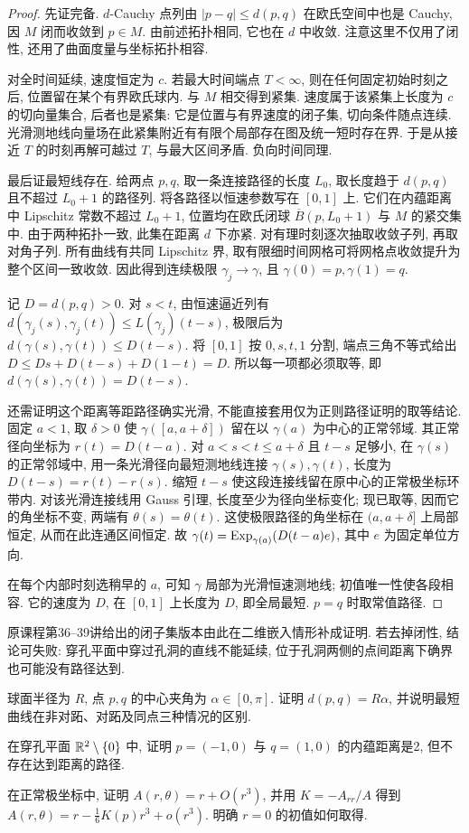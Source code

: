 \begin{proof}
先证完备. $d$-Cauchy 点列由 $|p-q|\le d(p,q)$ 在欧氏空间中也是 Cauchy, 因 $M$ 闭而收敛到 $p\in M$. 由前述拓扑相同, 它也在 $d$ 中收敛. 注意这里不仅用了闭性, 还用了曲面度量与坐标拓扑相容.

对全时间延续, 速度恒定为 $c$. 若最大时间端点 $T<\infty$, 则在任何固定初始时刻之后, 位置留在某个有界欧氏球内. 与 $M$ 相交得到紧集. 速度属于该紧集上长度为 $c$ 的切向量集合, 后者也是紧集: 它是位置与有界速度的闭子集, 切向条件随点连续. 光滑测地线向量场在此紧集附近有有限个局部存在图及统一短时存在界. 于是从接近 $T$ 的时刻再解可越过 $T$, 与最大区间矛盾. 负向时间同理.

最后证最短线存在. 给两点 $p,q$, 取一条连接路径的长度 $L_0$, 取长度趋于 $d(p,q)$ 且不超过 $L_0+1$ 的路径列. 将各路径以恒速参数写在 $[0,1]$ 上. 它们在内蕴距离中 Lipschitz 常数不超过 $L_0+1$, 位置均在欧氏闭球 $\overline B(p,L_0+1)$ 与 $M$ 的紧交集中. 由于两种拓扑一致, 此集在距离 $d$ 下亦紧. 对有理时刻逐次抽取收敛子列, 再取对角子列. 所有曲线有共同 Lipschitz 界, 取有限细时间网格可将网格点收敛提升为整个区间一致收敛. 因此得到连续极限 $\gamma_j\to\gamma$, 且 $\gamma(0)=p,\gamma(1)=q$.

记 $D=d(p,q)>0$. 对 $s<t$, 由恒速逼近列有 $d(\gamma_j(s),\gamma_j(t))\le L(\gamma_j)(t-s)$, 极限后为 $d(\gamma(s),\gamma(t))\le D(t-s)$. 将 $[0,1]$ 按 $0,s,t,1$ 分割, 端点三角不等式给出 $D\le Ds+D(t-s)+D(1-t)=D$. 所以每一项都必须取等, 即 $d(\gamma(s),\gamma(t))=D(t-s)$.

还需证明这个距离等距路径确实光滑, 不能直接套用仅为正则路径证明的取等结论. 固定 $a<1$, 取 $\delta>0$ 使 $\gamma([a,a+\delta])$ 留在以 $\gamma(a)$ 为中心的正常邻域. 其正常径向坐标为 $r(t)=D(t-a)$. 对 $a<s<t\le a+\delta$ 且 $t-s$ 足够小, 在 $\gamma(s)$ 的正常邻域中, 用一条光滑径向最短测地线连接 $\gamma(s),\gamma(t)$, 长度为 $D(t-s)=r(t)-r(s)$. 缩短 $t-s$ 使这段连接线留在原中心的正常极坐标环带内. 对该光滑连接线用 Gauss 引理, 长度至少为径向坐标变化; 现已取等, 因而它的角坐标不变, 两端有 $\theta(s)=\theta(t)$. 这使极限路径的角坐标在 $(a,a+\delta]$ 上局部恒定, 从而在此连通区间恒定. 故 $\gamma(t)=\operatorname{Exp}_{\gamma(a)}(D(t-a)e)$, 其中 $e$ 为固定单位方向.

在每个内部时刻选稍早的 $a$, 可知 $\gamma$ 局部为光滑恒速测地线; 初值唯一性使各段相容. 它的速度为 $D$, 在 $[0,1]$ 上长度为 $D$, 即全局最短. $p=q$ 时取常值路径.
\end{proof}
原课程第36--39讲给出的闭子集版本由此在二维嵌入情形补成证明. 若去掉闭性, 结论可失败: 穿孔平面中穿过孔洞的直线不能延续, 位于孔洞两侧的点间距离下确界也可能没有路径达到.
\begin{exercise}\label{ex:9a}
球面半径为 $R$, 点 $p,q$ 的中心夹角为 $\alpha\in[0,\pi]$. 证明 $d(p,q)=R\alpha$, 并说明最短曲线在非对跖、对跖及同点三种情况的区别.
\end{exercise}
\begin{exercise}\label{ex:9b}
在穿孔平面 $\mathbb R^2\setminus\{0\}$ 中, 证明 $p=(-1,0)$ 与 $q=(1,0)$ 的内蕴距离是2, 但不存在达到距离的路径.
\end{exercise}
\begin{exercise}\label{ex:9c}
在正常极坐标中, 证明 $A(r,\theta)=r+O(r^3)$, 并用 $K=-A_{rr}/A$ 得到 $A(r,\theta)=r-\frac16K(p)r^3+o(r^3)$. 明确 $r=0$ 的初值如何取得.
\end{exercise}
